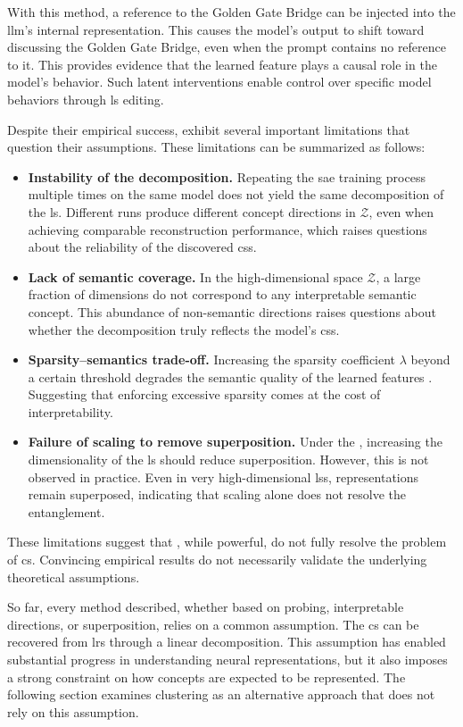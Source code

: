 With this method, a reference to the Golden Gate Bridge can be injected into the \gls{llm}'s internal representation.
This causes the model's output to shift toward discussing the Golden Gate Bridge, even when the prompt contains no reference to it.
This provides evidence that the learned feature plays a causal role in the model's behavior.
Such latent interventions enable control over specific model behaviors through \gls{ls} editing.

Despite their empirical success, \SuperpositionHypothesisName exhibit several important limitations that question their assumptions. 
These limitations can be summarized as follows:
\begin{itemize}
    \item \textbf{Instability of the decomposition.}
    Repeating the \gls{sae} training process multiple times on the same model does not yield the same decomposition of the \gls{ls}.
    Different runs produce different concept directions in $\mathcal{Z}$, even when achieving comparable reconstruction performance, which raises questions about the reliability of the discovered \glspl{cs}.

    \item \textbf{Lack of semantic coverage.}
    In the high-dimensional space $\mathcal{Z}$, a large fraction of dimensions do not correspond to any interpretable semantic concept.
    This abundance of non-semantic directions raises questions about whether the decomposition truly reflects the model's \glspl{cs}.

    \item \textbf{Sparsity--semantics trade-off.}
    Increasing the sparsity coefficient $\lambda$ beyond a certain threshold degrades the semantic quality of the learned features \parencite{tanhPenaltyDictionaryLearning}.
    Suggesting that enforcing excessive sparsity comes at the cost of interpretability.

    \item \textbf{Failure of scaling to remove superposition.}
    Under the \SuperpositionHypothesisName, increasing the dimensionality of the \gls{ls} should reduce superposition.
    However, this is not observed in practice.
    Even in very high-dimensional \glspl{ls}, representations remain superposed, indicating that scaling alone does not resolve the entanglement.
\end{itemize}

These limitations suggest that \SuperpositionHypothesisName, while powerful, do not fully resolve the problem of \gls{cs}.
Convincing empirical results do not necessarily validate the underlying theoretical assumptions.

So far, every method described, whether based on probing, interpretable directions, or superposition, relies on a common assumption.
The \gls{cs} can be recovered from \glspl{lr} through a linear decomposition.
This assumption has enabled substantial progress in understanding neural representations, but it also imposes a strong constraint on how concepts are expected to be represented.
The following section examines clustering as an alternative approach that does not rely on this assumption.
